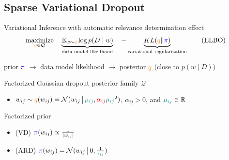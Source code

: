 \documentclass{beamer}
\newcommand{\real}{\mathbb{R}}
\begin{document}
\subsection{Sparse Variational Dropout} %
\label{sub:sparse_variational_dropout}

\begin{frame}[c]{\insertsubsection}{\citep{molchanov_variational_2017}}
  Variational Inference with automatic relevance determination effect
  \begin{equation}
    \label{eq:elbo}
    \underset{
      {\color{orange} q} \in \mathcal{Q}
    }{\text{maximize}}
    \quad
    \underbrace{
      \mathbb{E}_{w \sim {\color{orange} q}}
          \log p(D \mid w)  %
    }_{
      \text{data model likelihood}
    }
    \quad
    - \underbrace{
      \mathop{KL}({\color{orange} q}\|{\color{blue} \pi})
    }_{
      \text{variational regularization}
    }
    \tag{ELBO}
  \end{equation}

  \medskip
  prior ${\color{blue} \pi}$
    $\to$ data model likelihood
    $\to$ posterior ${\color{orange} q}$
    (close to $p(w \mid D)$)

  \bigskip

  \pause
  \bigskip
  Factorized Gaussian dropout posterior family $\mathcal{Q}$
  \begin{itemize}
    \item $
      w_{ij} \sim {\color{orange} q}(w_{ij})
        = \mathcal{N}(
          w_{ij}\,\big\vert\,
          {\color{teal} \mu_{ij}},
          {\color{red} \alpha_{ij}}
            {\color{teal} \mu_{ij}}^2
        )
    $, $\alpha_{ij} > 0$, and ${\color{teal} \mu_{ij}} \in \real$
  \end{itemize}

  \medskip
  Factorized prior
  \begin{itemize}
    \item (VD) $
      {\color{blue} \pi}(w_{ij})
        \propto \frac1{\lvert w_{ij}\rvert}
    $ {\tiny \citep{molchanov_variational_2017}}
    \item (ARD) $
      {\color{blue} \pi}(w_{ij}) = \mathcal{N}(
        w_{ij}\,\big\vert\,
        0, \tfrac1{{\color{teal} \tau_{ij}}}
      )
    $ {\tiny \citep{kharitonov_variational_2018}}
  \end{itemize}

\end{frame}
\end{document}
